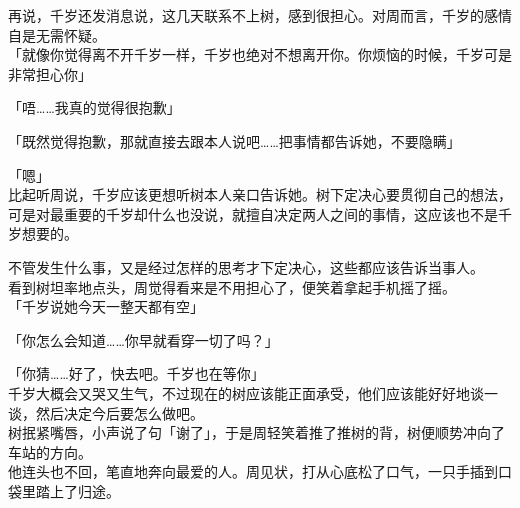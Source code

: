 再说，千岁还发消息说，这几天联系不上树，感到很担心。对周而言，千岁的感情自是无需怀疑。\\

「就像你觉得离不开千岁一样，千岁也绝对不想离开你。你烦恼的时候，千岁可是非常担心你」

「唔……我真的觉得很抱歉」

「既然觉得抱歉，那就直接去跟本人说吧……把事情都告诉她，不要隐瞒」

「嗯」\\

比起听周说，千岁应该更想听树本人亲口告诉她。树下定决心要贯彻自己的想法，可是对最重要的千岁却什么也没说，就擅自决定两人之间的事情，这应该也不是千岁想要的。

不管发生什么事，又是经过怎样的思考才下定决心，这些都应该告诉当事人。\\

看到树坦率地点头，周觉得看来是不用担心了，便笑着拿起手机摇了摇。\\

「千岁说她今天一整天都有空」

「你怎么会知道……你早就看穿一切了吗？」

「你猜……好了，快去吧。千岁也在等你」\\

千岁大概会又哭又生气，不过现在的树应该能正面承受，他们应该能好好地谈一谈，然后决定今后要怎么做吧。\\

树抿紧嘴唇，小声说了句「谢了」，于是周轻笑着推了推树的背，树便顺势冲向了车站的方向。\\

他连头也不回，笔直地奔向最爱的人。周见状，打从心底松了口气，一只手插到口袋里踏上了归途。\\

